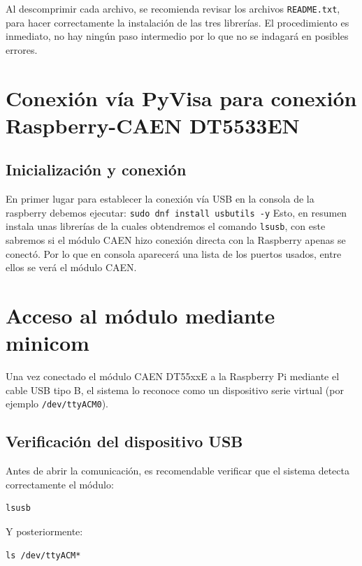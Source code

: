 \documentclass{article}
\begin{document}
Al descomprimir cada archivo, se recomienda revisar los archivos \texttt{README.txt}, para hacer correctamente la instalación de las tres librerías. El procedimiento es inmediato, no hay ningún paso intermedio por lo que no se indagará en posibles errores.\\


\section{Conexión vía PyVisa para conexión Raspberry-CAEN DT5533EN}


\subsection{Inicialización y conexión}

En primer lugar para establecer la conexión vía USB en la consola de la raspberry debemos ejecutar: 
\texttt{sudo dnf install usbutils -y}
Esto, en resumen instala unas librerías de la cuales obtendremos el comando \texttt{lsusb}, con este sabremos si el módulo CAEN hizo conexión directa con la Raspberry apenas se conectó. Por lo que en consola aparecerá una lista de los puertos usados, entre ellos se verá el módulo CAEN.\\

\section{Acceso al módulo mediante minicom}

Una vez conectado el módulo CAEN DT55xxE a la Raspberry Pi mediante el cable USB tipo B, el sistema lo reconoce como un dispositivo serie virtual (por ejemplo \texttt{/dev/ttyACM0}).

\subsection{Verificación del dispositivo USB}

Antes de abrir la comunicación, es recomendable verificar que el sistema detecta correctamente el módulo:

\begin{verbatim}
lsusb
\end{verbatim}

Y posteriormente:

\begin{verbatim}
ls /dev/ttyACM*
\end{verbatim}
\end{document}
